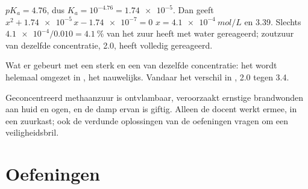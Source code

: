 \begin{example}\label{ex:g12:ka-and-pka:acetic}
$pK_a = 4.76$, dus $K_a = 10^{-4.76} = \num{1.74e-5}$. Dan geeft
$x^2 + \num{1.74e-5}\,x - \num{1.74e-7} = 0$
$x = \qty{4.1e-4}{mol/L}$ en  3.39. Slechts $\num{4.1e-4}/0.010 =
\qty{4.1}{\percent}$ van het zuur heeft met water gereageerd; zoutzuur van
dezelfde concentratie,  2.0, heeft volledig gereageerd.
\end{example}

\begin{omfigure}

{\small Wat er gebeurt met een sterk en een  van dezelfde
concentratie: het  wordt helemaal omgezet in , het  nauwelijks. Vandaar het verschil in , 2.0 tegen 3.4.}
\end{omfigure}

\begin{safety}{}
Geconcentreerd methaanzuur is ontvlambaar, veroorzaakt ernstige
brandwonden aan huid en ogen, en de damp ervan is giftig. Alleen de
docent werkt ermee, in een zuurkast; ook de verdunde oplossingen van de
oefeningen vragen om een veiligheidsbril.
\end{safety}

\section{Oefeningen}

